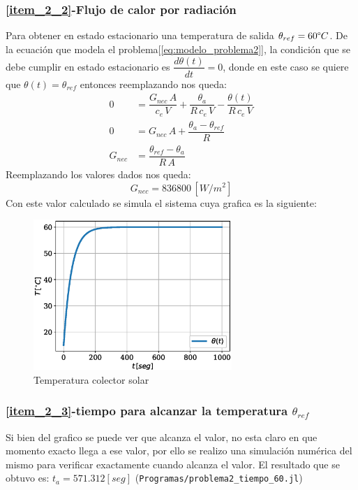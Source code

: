 \subsubsection{\ref{item_2_2}-Flujo de calor por radiación}
Para obtener en estado estacionario una temperatura de salida $\theta_{ref}=60\degree C$. De la ecuación que
modela el problema[\ref{eq:modelo_problema2}], la condición que se debe cumplir en estado estacionario
es $\dfrac{d\theta(t)}{dt} = 0$, donde en este caso se quiere que $\theta(t)=\theta_{ref}$ entonces
reemplazando nos queda:
\begin{align}
   0 &= \dfrac{G_{nec}\,A}{c_{e}\,V} + \dfrac{\theta_{a}}{R\,c_{e}\,V} - \dfrac{\theta(t)}{R\,c_{e}\,V}\\
   0 &= G_{nec} \, A + \dfrac{\theta_{a}-\theta_{ref}}{R}\\
   G_{nec} &= \dfrac{\theta_{ref}-\theta_{a}}{R\,A}\label{eq:flujo_necesario}
\end{align}
Reemplazando los valores dados nos queda:
\begin{equation}
   G_{nec} = 836800 \,[W/m^{2}]
\end{equation}
Con este valor calculado se simula el sistema cuya grafica es la siguiente:

\begin{figure}[H]
   \centering
   \includegraphics[width=0.67\textwidth]{Images/temperatura_colector.eps}
   \caption{Temperatura colector solar}\label{fig:colector_temperatura}
\end{figure}


\subsubsection{\ref{item_2_3}-tiempo para alcanzar la temperatura $\theta_{ref}$}
Si bien del grafico se puede ver que alcanza el valor, no esta claro en que momento exacto llega a ese valor,
por ello se realizo una simulación numérica del mismo para verificar exactamente cuando
alcanza el valor. El resultado que se obtuvo es: $t_a =571.312[seg]$ (\verb|Programas/problema2_tiempo_60.jl|)

